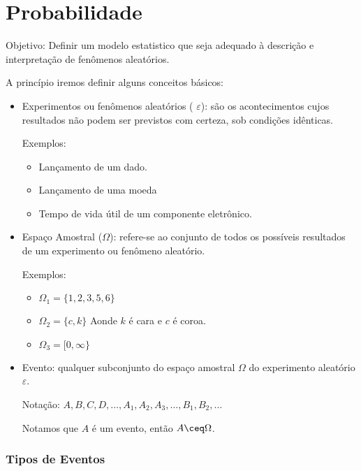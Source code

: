 \documentclass[11pt,a4paper]{book}
\begin{document}
\chapter{Probabilidade}
Objetivo: Definir um modelo estatistico que seja adequado à descrição e interpretação de fenômenos aleatórios.

A princípio iremos definir alguns conceitos básicos:
\begin{itemize}
  \item Experimentos ou fenômenos aleatórios ( $\varepsilon$): são os acontecimentos cujos resultados não podem ser previstos 
    com certeza, sob condições idênticas.

    Exemplos: 
    \begin{itemize}
      \item Lançamento de um dado.
       \item Lançamento de uma moeda
       \item Tempo de vida útil de um componente eletrônico.
    \end{itemize}

  \item Espaço Amostral ($\Omega$): refere-se ao conjunto de todos os possíveis resultados de um experimento ou fenômeno 
    aleatório.

    Exemplos:
    \begin{itemize}
      \item $\Omega_1= \{ 1,2,3,5,6 \}$ 
      \item $\Omega_2= \{ c,k \}$ Aonde $k$ é cara e $c$ é coroa.
      \item $\Omega_3= [ 0,\infty \}$ 
    \end{itemize}

  \item Evento: qualquer subconjunto do espaço amostral $\Omega$ do experimento aleatório $\varepsilon$.

    Notação: $A,B,C,D,\dots,A_1,A_2,A_3,\dots,B_1,B_2,\dots$

    Notamos que $A$ é um evento, então $A \ceq \Omega$.

\end{itemize}
\subsection{Tipos de Eventos}
\end{document}
